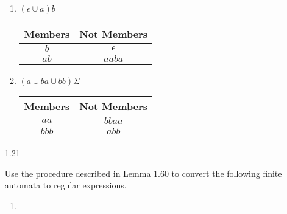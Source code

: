 \begin{enumerate}
\begin{enumerate}
              \item $ (\epsilon  \cup a)b $
                    \begin{table}[H]
                        \centering
                        \begin{tabular}{|c|c|}
                            \hline
                            Members & Not Members \\
                            \hline
                            $b$     & $\epsilon$  \\
                            $ab$    & $aaba$      \\
                            \hline
                        \end{tabular}
                    \end{table}
              \item $(a\cup ba \cup bb)\Sigma$
                    \begin{table}[H]
                        \centering
                        \begin{tabular}{|c|c|}
                            \hline
                            Members & Not Members \\
                            \hline
                            $aa$    & $bbaa$      \\
                            $bbb$   & $abb$       \\
                            \hline
                        \end{tabular}
                    \end{table}
          \end{enumerate}

    \item [1.21]

          Use the procedure described in Lemma 1.60 to convert the following finite automata to regular expressions.
          \begin{enumerate}
              \item

                    \begin{figure}[H]
                        \centering
                    \end{figure}
                    

\end{enumerate}
\end{enumerate}
